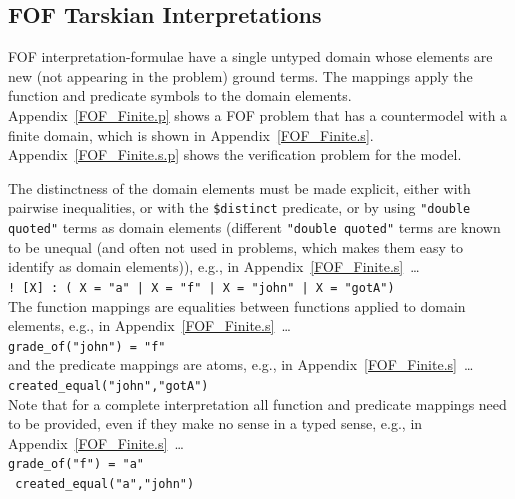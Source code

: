 \documentclass{easychair}
\newcommand{\smalltt}[1]{\small \texttt{#1}}
\begin{document}
\subsection{FOF Tarskian Interpretations}
\label{NewTarskianFOF}

FOF interpretation-formulae have a single untyped domain whose elements are new (not appearing 
in the problem) ground terms. 
The mappings apply the function and predicate symbols to the domain elements.
Appendix~\ref{FOF_Finite.p} shows a FOF problem that has a countermodel with a finite domain, 
which is shown in Appendix~\ref{FOF_Finite.s}.
Appendix~\ref{FOF_Finite.s.p} shows the verification problem for the model.

The distinctness of the domain elements must be made explicit, either with pairwise inequalities, 
or with the {\tt \$distinct} predicate, or by using {\tt "double quoted"} terms as domain 
elements (different {\tt "double quoted"} terms are known to be unequal (and often not used in 
problems, which makes them easy to identify as domain elements)), e.g., in 
Appendix~\ref{FOF_Finite.s}~\ldots \\
\hspace*{0.5cm}\smalltt{! [X] : ( X = "a" | X = "f" | X = "john" | X = "gotA")} \\
The function mappings are equalities between functions applied to domain elements, e.g., in 
Appendix~\ref{FOF_Finite.s}~\ldots \\
\hspace*{0.5cm}\smalltt{grade\_of("john") = "f"}\\
and the predicate mappings are atoms, e.g., in Appendix~\ref{FOF_Finite.s}~\ldots \\
\hspace*{0.5cm}\smalltt{created\_equal("john","gotA")}\\
Note that for a complete interpretation all function and predicate mappings need to be provided,
even if they make no sense in a typed sense, e.g., in Appendix~\ref{FOF_Finite.s}~\ldots \\
\hspace*{0.5cm}\smalltt{grade\_of("f") = "a"}\\
\hspace*{0.5cm}\smalltt{{\raisebox{0.4ex}{\texttildelow}} created\_equal("a","john")}


\end{document}
